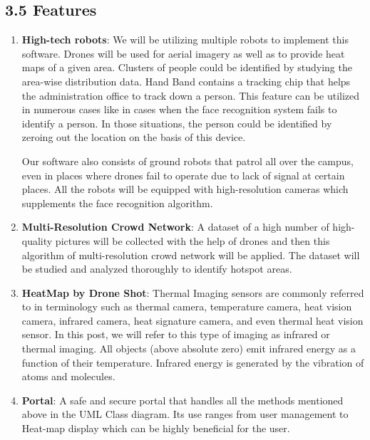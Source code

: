 \documentclass[eng]{FCEFyN-class}
\begin{document}
\subsection{3.5 Features}
\begin{enumerate}
    \item \textbf{High-tech robots}: We will be utilizing multiple robots to implement this software. Drones will be used for aerial imagery as well as to provide heat maps of a given area. Clusters of people could be identified by studying the area-wise distribution data. Hand Band contains a tracking chip that helps the administration office to track down a person. This feature can be utilized in numerous cases like in cases when the face recognition system fails to identify a person. In those situations, the person could be identified by zeroing out the location on the basis of this device.

    Our software also consists of ground robots that patrol all over the campus, even in places where drones fail to operate due to lack of signal at certain places. All the robots will be equipped with high-resolution cameras which supplements the face recognition algorithm.
    
    \item \textbf{Multi-Resolution Crowd Network}: A dataset of a high number of high-quality pictures will be collected with the help of drones and then this algorithm of multi-resolution crowd network will be applied. The dataset will be studied and analyzed thoroughly to identify hotspot areas. 
    
    \item \textbf{HeatMap by Drone Shot}: Thermal Imaging sensors are commonly referred to in terminology such as thermal camera, temperature camera, heat vision camera, infrared camera, heat signature camera, and even thermal heat vision sensor. In this post, we will refer to this type of imaging as infrared or thermal imaging. All objects (above absolute zero) emit infrared energy as a function of their temperature. Infrared energy is generated by the vibration of atoms and molecules. 
    
    \item \textbf{Portal}: A safe and secure portal that handles all the methods mentioned above in the UML Class diagram. Its use ranges from user management to Heat-map display which can be highly beneficial for the user.


\end{enumerate}
\end{document}
